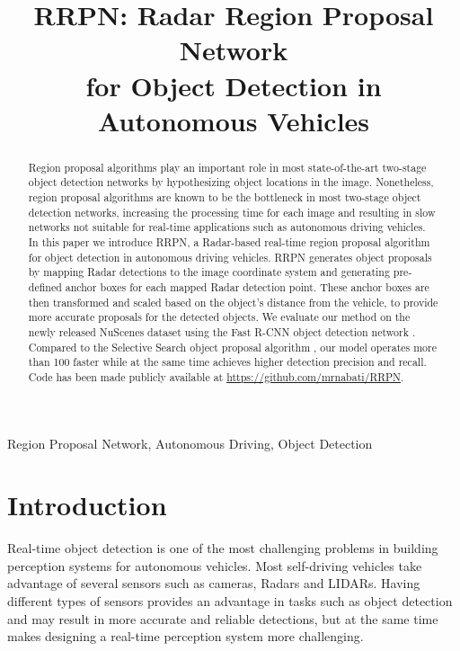 \documentclass{article}
\title{RRPN: Radar Region Proposal Network \\for Object Detection in Autonomous Vehicles}
\newcommand{\dataset}{NuScenes }
\begin{document}
\maketitle
\begin{abstract}
Region proposal algorithms play an important role in most state-of-the-art 
two-stage object detection networks by hypothesizing object locations in 
the image. Nonetheless, region proposal algorithms are known to be the bottleneck 
in most two-stage object detection networks, increasing the processing time for each 
image and resulting in slow networks not suitable for real-time applications 
such as autonomous driving vehicles.
In this paper we introduce RRPN, a Radar-based real-time region proposal algorithm 
for object detection in autonomous driving vehicles. RRPN generates object 
proposals by mapping Radar detections to the image coordinate system and 
generating pre-defined anchor boxes for each mapped Radar detection point. These 
anchor boxes are then transformed and scaled based on the object's distance from 
the vehicle, to provide more accurate proposals for the detected objects.
We evaluate our method on the newly 
released \dataset dataset \cite{caesar2019nuscenes} using the Fast R-CNN object detection network 
\cite{Girshick2015}. Compared to the Selective Search object proposal 
algorithm \cite{ss2013}, our model operates more than 100 
faster while at the same time achieves higher detection precision and recall.
Code has been made publicly available at \url{https://github.com/mrnabati/RRPN}.
\end{abstract}
\begin{keywords}
Region Proposal Network, Autonomous Driving, Object Detection
\end{keywords}

\section{Introduction}
\label{sec:intro}

Real-time object detection is one of the most challenging problems in building 
perception systems for autonomous vehicles. Most self-driving vehicles take 
advantage of several sensors such as cameras, Radars and LIDARs. Having different 
types of sensors provides an advantage in tasks such as object detection and may 
result in more accurate and reliable detections, but at the same time makes 
designing a real-time perception 
system more challenging.
\end{document}
